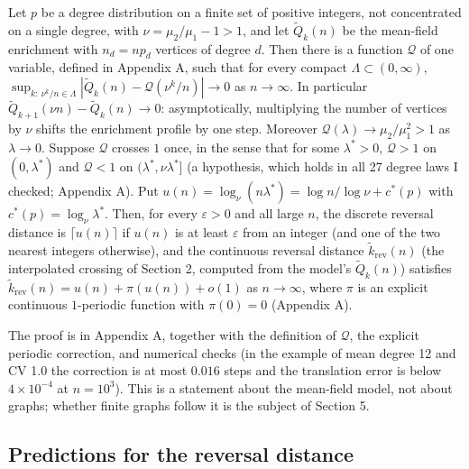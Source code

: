 \documentclass{nws}
\begin{document}
\begin{proposition}
Let $p$ be a degree distribution on a finite set of positive integers, not concentrated on a single degree, with
$\nu=\mu_2/\mu_1-1>1$, and let $\tilde Q_k(n)$ be the mean-field enrichment with
$n_d=np_d$ vertices of degree $d$. Then there is a function $\mathcal Q$ of one variable, defined in
Appendix A, such that for every compact $\Lambda\subset(0,\infty)$,
$\sup_{k:\ \nu^k/n\in\Lambda}|\tilde Q_k(n)-\mathcal Q(\nu^k/n)|\to0$ as $n\to\infty$.
In particular $\tilde Q_{k+1}(\nu n)-\tilde Q_k(n)\to0$: asymptotically, multiplying the number of vertices
by $\nu$ shifts the enrichment profile by one step. Moreover $\mathcal Q(\lambda)\to\mu_2/\mu_1^2>1$
as $\lambda\to0$. Suppose $\mathcal Q$ crosses $1$ once, in the sense that for some $\lambda^*>0$,
$\mathcal Q>1$ on $(0,\lambda^*)$ and $\mathcal Q<1$ on $(\lambda^*,\nu\lambda^*]$ (a hypothesis, which holds in all 27 degree laws I checked; Appendix A). Put $u(n)=\log_\nu(n\lambda^*)=\log n/\log\nu+c^*(p)$ with $c^*(p)=\log_\nu\lambda^*$.
Then, for every $\varepsilon>0$ and all large $n$, the discrete reversal distance is $\lceil u(n)\rceil$ if $u(n)$ is
at least $\varepsilon$ from an integer (and one of the two nearest integers otherwise), and the continuous
reversal distance $\tilde k_{\mathrm{rev}}(n)$ (the interpolated crossing of Section 2, computed from the model's $\tilde Q_k(n)$) satisfies $\tilde k_{\mathrm{rev}}(n)=u(n)+\pi(u(n))+o(1)$ as $n\to\infty$, where $\pi$ is an explicit
continuous $1$-periodic function with $\pi(0)=0$ (Appendix A).
\end{proposition}

The proof is in Appendix A, together with the definition of $\mathcal Q$, the explicit periodic correction, and numerical checks (in the example of mean degree 12 and CV 1.0 the correction is at most $0.016$ steps and the translation error is below $4\times10^{-4}$ at $n=10^3$). This is a statement about the mean-field model, not about graphs; whether finite graphs follow it is the subject of Section 5.

\subsection{Predictions for the reversal distance}
\end{document}
